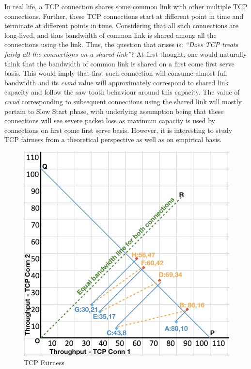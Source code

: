 \begin{multicols}{2}
In real life, a TCP connection shares  some common link with other multiple TCP connections. Further, these TCP connections start at different point in time and terminate at different points in time.  Considering that all such connections are long-lived, and thus bandwidth of common link is shared among all the connections using the link. Thus, the question that arises is: \textit{“Does TCP treats fairly all the connections on a shared link”?} At first thought, one would naturally think that the bandwidth of common link is shared on a first come first serve basis. This would imply that first such connection will consume almost full bandwidth and its \textit{cwnd} value will approximately correspond to shared link capacity and follow the saw tooth behaviour around this capacity. The value of \textit{cwnd} corresponding to subsequent connections using the shared link will mostly pertain to Slow Start phase, with underlying assumption being that these connections will see severe packet loss as maximum capacity is used by connections on first come first serve basis. However, it is interesting to study TCP fairness from a theoretical perspective as well as on empirical basis.
\begin{figure}[H]
\centering
\includegraphics[scale=1.27]{src/Figures/chap2/chap2-fig06.jpg}
\caption{TCP Fairness}\label{chap2-fig06}
\end{figure}


\end{multicols}
